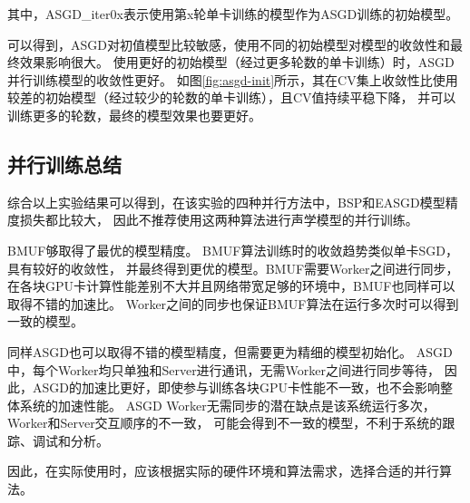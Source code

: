 其中，ASGD\_iter0x表示使用第x轮单卡训练的模型作为ASGD训练的初始模型。

可以得到，ASGD对初值模型比较敏感，使用不同的初始模型对模型的收敛性和最终效果影响很大。
使用更好的初始模型（经过更多轮数的单卡训练）时，ASGD并行训练模型的收敛性更好。
如图\ref{fig:asgd-init}所示，其在CV集上收敛性比使用较差的初始模型（经过较少的轮数的单卡训练），且CV值持续平稳下降，
并可以训练更多的轮数，最终的模型效果也要更好。

\subsection{并行训练总结}

综合以上实验结果可以得到，在该实验的四种并行方法中，BSP和EASGD模型精度损失都比较大，
因此不推荐使用这两种算法进行声学模型的并行训练。

BMUF够取得了最优的模型精度。
BMUF算法训练时的收敛趋势类似单卡SGD，具有较好的收敛性，
并最终得到更优的模型。BMUF需要Worker之间进行同步，
在各块GPU卡计算性能差别不大并且网络带宽足够的环境中，BMUF也同样可以取得不错的加速比。
Worker之间的同步也保证BMUF算法在运行多次时可以得到一致的模型。

同样ASGD也可以取得不错的模型精度，但需要更为精细的模型初始化。
ASGD中，每个Worker均只单独和Server进行通讯，无需Worker之间进行同步等待，
因此，ASGD的加速比更好，即使参与训练各块GPU卡性能不一致，也不会影响整体系统的加速性能。
ASGD Worker无需同步的潜在缺点是该系统运行多次，Worker和Server交互顺序的不一致，
可能会得到不一致的模型，不利于系统的跟踪、调试和分析。

因此，在实际使用时，应该根据实际的硬件环境和算法需求，选择合适的并行算法。

